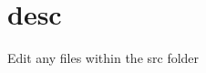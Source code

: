 \chapter{desc}
\hypertarget{md__d_1_2_g_i_t_2_food_link_2foodlink_8client_2node__modules_2bs-recipes_2recipes_2webpack_8babel_2desc}{}\label{md__d_1_2_g_i_t_2_food_link_2foodlink_8client_2node__modules_2bs-recipes_2recipes_2webpack_8babel_2desc}
Edit any files within the {\ttfamily src} folder 
